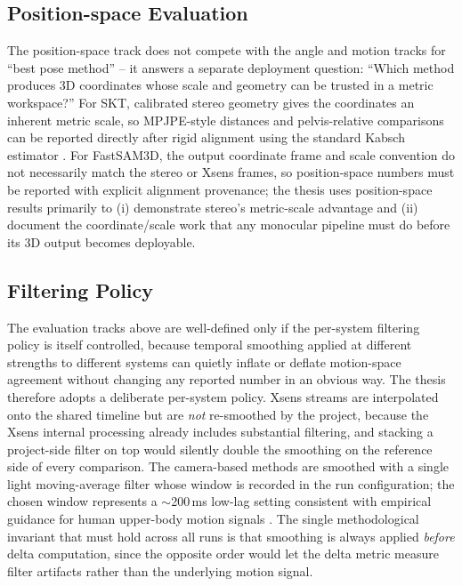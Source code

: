 \documentclass[12pt,a4paper]{article}
\begin{document}
\subsection{Position-space Evaluation}

The position-space track does not compete with the angle and motion
tracks for ``best pose method'' -- it answers a separate deployment
question: ``Which method produces 3D coordinates whose scale and
geometry can be trusted in a metric workspace?''
For SKT, calibrated stereo geometry gives the coordinates an inherent
metric scale, so MPJPE-style distances and pelvis-relative comparisons
can be reported directly after rigid alignment using the standard Kabsch
estimator \cite{kabsch1976solution}.
For FastSAM3D, the output coordinate frame and scale convention do not
necessarily match the stereo or Xsens frames, so position-space numbers
must be reported with explicit alignment provenance; the thesis uses
position-space results primarily to (i) demonstrate stereo's
metric-scale advantage and (ii) document the coordinate/scale work that
any monocular pipeline must do before its 3D output becomes deployable.

\subsection{Filtering Policy}

The evaluation tracks above are well-defined only if the per-system
filtering policy is itself controlled, because temporal smoothing
applied at different strengths to different systems can quietly inflate
or deflate motion-space agreement without changing any reported number
in an obvious way.
The thesis therefore adopts a deliberate per-system policy.
Xsens streams are interpolated onto the shared timeline but are
\emph{not} re-smoothed by the project, because the Xsens internal
processing already includes substantial filtering, and stacking a
project-side filter on top would silently double the smoothing on
the reference side of every comparison.
The camera-based methods are smoothed with a single light moving-average
filter whose window is recorded in the run configuration; the chosen
window represents a $\sim$200\,ms low-lag setting consistent with empirical
guidance for human upper-body motion signals \cite{perezluque2026reaching}.
The single methodological invariant that must hold across all runs is
that smoothing is always applied \emph{before} delta computation, since
the opposite order would let the delta metric measure filter artifacts
rather than the underlying motion signal.
\end{document}
